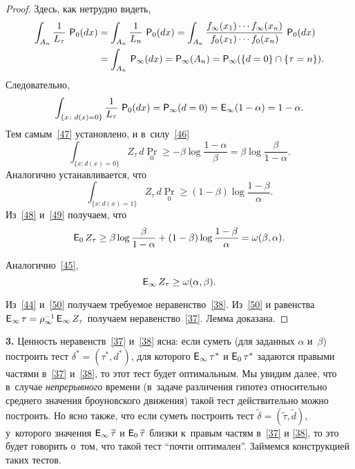 \begin{proof}
	Здесь, как нетрудно видеть,
	\begin{align}
	\int_{A_n}\frac{1}{L_{\tau}}\,\Pr_0(dx)
	&
	=\int_{A_n}\frac{1}{L_n}\,\Pr_0(dx)
	=\int_{A_n}
	\frac
	{f_{\infty}(x_1)\cdots f_{\infty}(x_n)}
	{f_{0}(x_1)\cdots f_{0}(x_n)}
	\,\Pr_0(dx)\notag\\
	&
	=\int_{A_n}\,\Pr_{\infty}(dx)
	=\Pr_{\infty}(A_n)
	=\Pr_{\infty}(\{d=0\}\cap\{\tau=n\}).\notag
	\end{align}
	Следовательно,
	\[
	\int_{\{x\colon d(x)=0\}}\frac{1}{L_{\tau}}\,\Pr_0(dx)
	=\Pr_{\infty}(d=0)
	=\E_{\infty}(1-\alpha)
	=1-\alpha.
	\]
	Тем самым~\eqref{47} установлено, и в~силу~\eqref{46}
	\begin{equation}
	\label{48}%
	\int_{\{x\colon d(x)=0\}}Z_{\tau}\,d\Pr_0
	\ge-\beta\log\frac{1-\alpha}{\beta}
	=\beta\log\frac{\beta}{1-\alpha}.
	\end{equation}
	Аналогично устанавливается, что
	\begin{equation}
	\label{49}%
	\int_{\{x\colon d(x)=1\}}Z_{\tau}\,d\Pr_0
	\ge(1-\beta)\log\frac{1-\beta}{\alpha}.
	\end{equation}
	Из~\eqref{48} и~\eqref{49} получаем, что
	\begin{equation}
	\label{50}%
	\E_0Z_{\tau}
	\ge\beta\log\frac{\beta}{1-\alpha}+(1-\beta)\log\frac{1-\beta}{\alpha}
	=\omega(\beta,\alpha).
	\end{equation}
	
	Аналогично~\eqref{45},
	\begin{equation}
	\label{51}%
	\E_{\infty}Z_{\tau}\ge\omega(\alpha,\beta).
	\end{equation}
	
	Из~\eqref{44} и~\eqref{50} получаем требуемое
	неравенство~\eqref{38}. Из~\eqref{50} и равенства
	$\E_{\infty}\tau=\rho_{\infty}^{-1}\E_{\infty}Z_{\tau}$ получаем
	неравенство~\eqref{37}. Лемма доказана.
\end{proof}

\textbf{3.} Ценность неравенств~\eqref{37} и~\eqref{38} ясна: если
суметь (для заданных $\alpha$ и~$\beta$) построить тест
$\delta^*=(\tau^*,d^*)$, для которого $\E_{\infty}\tau^*$ и
$\E_0\tau^*$ задаются правыми частями в~\eqref{37} и~\eqref{38},
то этот тест будет оптимальным. Мы увидим далее, что в~случае
\textit{непрерывного} времени (в~задаче различения гипотез
относительно среднего значения броуновского движения) такой тест
действительно можно построить. Но ясно также, что если суметь
построить тест $\tilde{\delta}=(\widetilde{\tau},\tilde{d})$,
у~которого значения $\E_{\infty}\widetilde{\tau}$ и
$\E_0\widetilde{\tau}$ близки к~правым частям в~\eqref{37} и
\eqref{38}, то это будет говорить о~том, что такой тест ``почти
оптимален''. Займемся конструкцией таких тестов.

